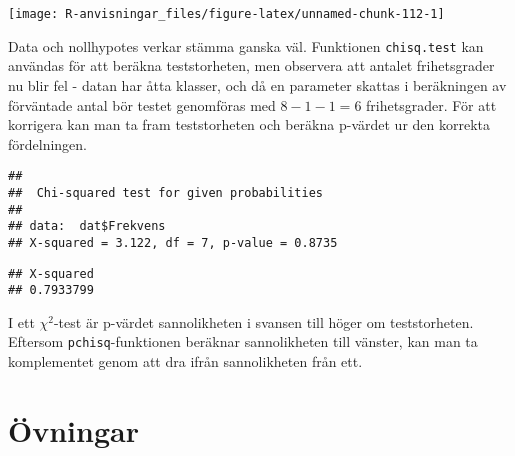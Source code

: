 \documentclass[
]{book}
\newenvironment{Shaded}{\begin{snugshade}}{\end{snugshade}}
\newcommand{\AttributeTok}[1]{\textcolor[rgb]{0.77,0.63,0.00}{#1}}
\newcommand{\DecValTok}[1]{\textcolor[rgb]{0.00,0.00,0.81}{#1}}
\newcommand{\FunctionTok}[1]{\textcolor[rgb]{0.00,0.00,0.00}{#1}}
\newcommand{\NormalTok}[1]{#1}
\newcommand{\OtherTok}[1]{\textcolor[rgb]{0.56,0.35,0.01}{#1}}
\newcommand{\SpecialCharTok}[1]{\textcolor[rgb]{0.00,0.00,0.00}{#1}}
\theoremstyle{definition}
\theoremstyle{definition}
\theoremstyle{definition}
\theoremstyle{definition}
\theoremstyle{remark}
\begin{document}
\begin{center}\texttt{[image: R-anvisningar\_files/figure-latex/unnamed-chunk-112-1]} \end{center}

Data och nollhypotes verkar stämma ganska väl. Funktionen \texttt{chisq.test} kan användas för att beräkna teststorheten, men observera att antalet frihetsgrader nu blir fel - datan har åtta klasser, och då en parameter skattas i beräkningen av förväntade antal bör testet genomföras med \(8-1-1=6\) frihetsgrader. För att korrigera kan man ta fram teststorheten och beräkna p-värdet ur den korrekta fördelningen.

\begin{Shaded}
\end{Shaded}

\begin{verbatim}
## 
##  Chi-squared test for given probabilities
## 
## data:  dat$Frekvens
## X-squared = 3.122, df = 7, p-value = 0.8735
\end{verbatim}

\begin{Shaded}
\end{Shaded}

\begin{verbatim}
## X-squared 
## 0.7933799
\end{verbatim}

I ett \(\chi^2\)-test är p-värdet sannolikheten i svansen till höger om teststorheten. Eftersom \texttt{pchisq}-funktionen beräknar sannolikheten till vänster, kan man ta komplementet genom att dra ifrån sannolikheten från ett.

\hypertarget{uxf6vningar-2}{%
\section{Övningar}\label{uxf6vningar-2}}
\end{document}
